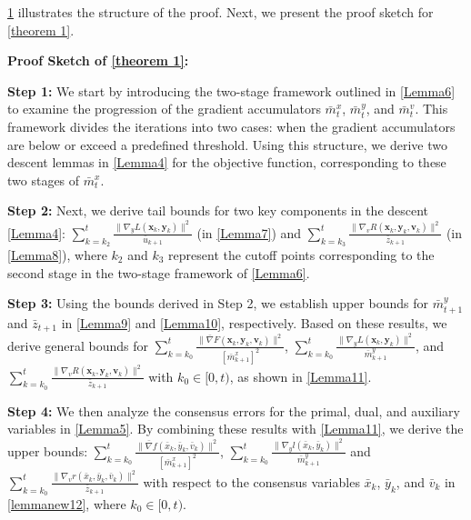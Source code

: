 \documentclass{article}
\theoremstyle{plain}
\theoremstyle{definition}
\theoremstyle{remark}
\begin{document}
\begin{figure}[omitted: a diagram of this paper's results, not reproduced here]\label{fig:proof_structure}\end{figure}

\cref{fig:proof_structure} illustrates the structure of the proof. Next, we present the proof sketch for \cref{theorem 1}.

\textbf{Proof Sketch of \cref{theorem 1}:}

\textbf{Step 1:} We start by introducing the two-stage framework outlined in \cref{Lemma6} to examine the progression of the gradient accumulators \(\bar{m}^x_t\), \(\bar{m}^y_t\), and \(\bar{m}^v_t\). This framework divides the iterations into two cases: when the gradient accumulators are below or exceed a predefined threshold. Using this structure, we derive two descent lemmas in \cref{Lemma4} for the objective function, corresponding to these two stages of \(\bar{m}^x_t\).

\textbf{Step 2:} Next, we derive tail bounds for two key components in the descent \cref{Lemma4}:
$\sum_{k=k_2}^t \frac{\|\nabla_y L(\mathbf{x}_k, \mathbf{y}_k)\|^2}{\bar{u}_{k+1}}$ (in \cref{Lemma7}) and $\sum_{k=k_3}^t \frac{\|\nabla_v R(\mathbf{x}_k, \mathbf{y}_k, \mathbf{v}_k)\|^2}{\bar{z}_{k+1}}$ (in \cref{Lemma8}),
where \(k_2\) and \(k_3\) represent the cutoff points corresponding to the second stage in the two-stage framework of \cref{Lemma6}.


\textbf{Step 3:} Using the bounds derived in Step 2, we establish upper bounds for \(\bar{m}^y_{t+1}\) and \(\bar{z}_{t+1}\) in \cref{Lemma9} and \cref{Lemma10}, respectively. Based on these results, we derive general bounds for $\sum_{k=k_0}^t \frac{\|\bar{\nabla} F(\mathbf{x}_k,\mathbf{y}_k,\mathbf{v}_k)\|^2}{[\bar{m}^x_{k+1}]^2}$, $\sum_{k=k_0}^t \frac{\|\nabla_y L(\mathbf{x}_k, \mathbf{y}_k)\|^2}{\bar{m}^y_{k+1}}$, and $\sum_{k=k_0}^t \frac{\|\nabla_v R(\mathbf{x}_k, \mathbf{y}_k, \mathbf{v}_k)\|^2}{\bar{z}_{k+1}}$ with \(k_0 \in [0, t)\), as shown in \cref{Lemma11}. 

\textbf{Step 4:} We then analyze the consensus errors for the primal, dual, and auxiliary variables in \cref{Lemma5}. By combining these results with \cref{Lemma11}, we derive the upper bounds: $\sum_{k=k_0}^t \frac{\|\bar{\nabla} f(\bar{x}_k, \bar{y}_k, \bar{v}_k)\|^2}{[\bar{m}^x_{k+1}]^2}$, $\sum_{k=k_0}^t \frac{\|\nabla_y l(\bar{x}_k, \bar{y}_k)\|^2}{\bar{m}^y_{k+1}}$ and $\sum_{k=k_0}^t \frac{\|\nabla_v r(\bar{x}_k, \bar{y}_k, \bar{v}_k)\|^2}{\bar{z}_{k+1}}$ with respect to the consensus variables $\bar{x}_k$, $\bar{y}_k$, and $\bar{v}_k$ in \cref{lemmanew12}, where \(k_0 \in [0, t)\).
\end{document}

